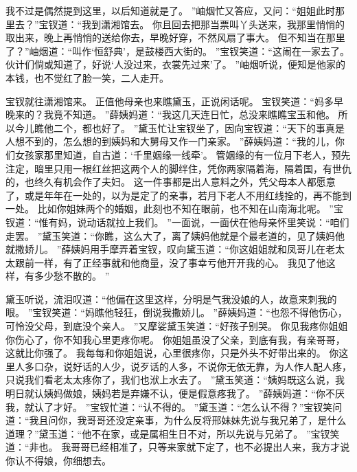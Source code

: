 我不过是偶然提到这里，以后知道就是了。
”岫烟忙又答应，又问：“姐姐此时那里去？”宝钗道：“我到潇湘馆去。
你且回去把那当票叫丫头送来，我那里悄悄的取出来，晚上再悄悄的送给你去，早晚好穿，不然风扇了事大。
但不知当在那里了？”岫烟道：“叫作‘恒舒典’，是鼓楼西大街的。
”宝钗笑道：“这闹在一家去了。
伙计们倘或知道了，好说‘人没过来，衣裳先过来’了。
”岫烟听说，便知是他家的本钱，也不觉红了脸一笑，二人走开。
\par
宝钗就往潇湘馆来。
正值他母亲也来瞧黛玉，正说闲话呢。
宝钗笑道：“妈多早晚来的？我竟不知道。
”薛姨妈道：“我这几天连日忙，总没来瞧瞧宝玉和他。
所以今儿瞧他二个，都也好了。
”黛玉忙让宝钗坐了，因向宝钗道：“天下的事真是人想不到的，怎么想的到姨妈和大舅母又作一门亲家。
”薛姨妈道：“我的儿，你们女孩家那里知道，自古道：‘千里姻缘一线牵’。
管姻缘的有一位月下老人，预先注定，暗里只用一根红丝把这两个人的脚绊住，凭你两家隔着海，隔着国，有世仇的，也终久有机会作了夫妇。
这一件事都是出人意料之外，凭父母本人都愿意了，或是年年在一处的，以为是定了的亲事，若月下老人不用红线拴的，再不能到一处。
比如你姐妹两个的婚姻，此刻也不知在眼前，也不知在山南海北呢。
”宝钗道：“惟有妈，说动话就拉上我们。
”一面说，一面伏在他母亲怀里笑说：“咱们走罢。
”黛玉笑道：“你瞧，这么大了，离了姨妈他就是个最老道的，见了姨妈他就撒娇儿。
”薛姨妈用手摩弄着宝钗，叹向黛玉道：“你这姐姐就和凤哥儿在老太太跟前一样，有了正经事就和他商量，没了事幸亏他开开我的心。
我见了他这样，有多少愁不散的。
”\par
黛玉听说，流泪叹道：“他偏在这里这样，分明是气我没娘的人，故意来刺我的眼。
”宝钗笑道：“妈瞧他轻狂，倒说我撒娇儿。
”薛姨妈道：“也怨不得他伤心，可怜没父母，到底没个亲人。
”又摩娑黛玉笑道：“好孩子别哭。
你见我疼你姐姐你伤心了，你不知我心里更疼你呢。
你姐姐虽没了父亲，到底有我，有亲哥哥，这就比你强了。
我每每和你姐姐说，心里很疼你，只是外头不好带出来的。
你这里人多口杂，说好话的人少，说歹话的人多，不说你无依无靠，为人作人配人疼，只说我们看老太太疼你了，我们也洑上水去了。
”黛玉笑道：“姨妈既这么说，我明日就认姨妈做娘，姨妈若是弃嫌不认，便是假意疼我了。
”薛姨妈道：“你不厌我，就认了才好。
”宝钗忙道：“认不得的。
”黛玉道：“怎么认不得？”宝钗笑问道：“我且问你，我哥哥还没定亲事，为什么反将邢妹妹先说与我兄弟了，是什么道理？”黛玉道：“他不在家，或是属相生日不对，所以先说与兄弟了。
”宝钗笑道：“非也。
我哥哥已经相准了，只等来家就下定了，也不必提出人来，我方才说你认不得娘，你细想去。
